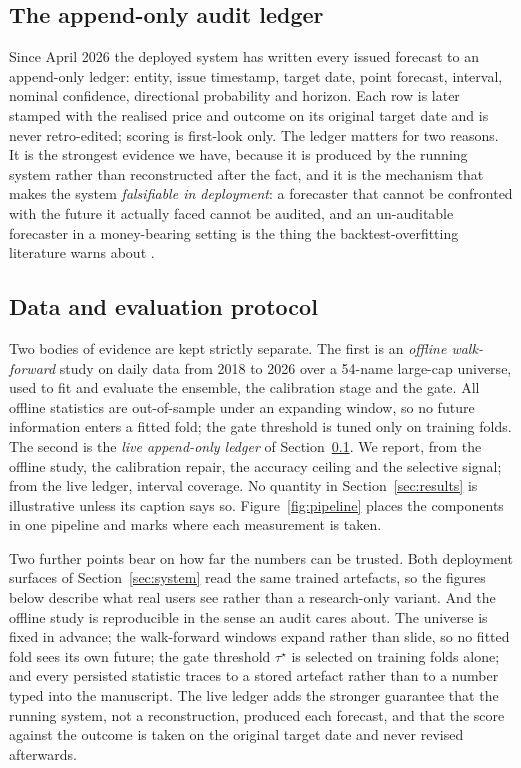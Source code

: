 \documentclass{sbc2023}%
\theoremstyle{definition}
\theoremstyle{plain}
\begin{document}
\subsection{The append-only audit ledger}
\label{sec:ledger}
Since April 2026 the deployed system has written every issued forecast to an
append-only ledger: entity, issue timestamp, target date, point forecast, interval,
nominal confidence, directional probability and horizon. Each row is later stamped
with the realised price and outcome on its original target date and is never
retro-edited; scoring is first-look only. The ledger matters for two reasons. It is
the strongest evidence we have, because it is produced by the running system rather
than reconstructed after the fact, and it is the mechanism that makes the system
\emph{falsifiable in deployment}: a forecaster that cannot be confronted with the
future it actually faced cannot be audited, and an un-auditable forecaster in a
money-bearing setting is the thing the backtest-overfitting literature warns about
\citep{bailey2017}.

\subsection{Data and evaluation protocol}
\label{sec:data}
Two bodies of evidence are kept strictly separate. The first is an \emph{offline
walk-forward} study on daily data from 2018 to 2026 over a 54-name large-cap universe,
used to fit and evaluate the ensemble, the calibration stage and the gate. All offline
statistics are out-of-sample under an expanding window, so no future information enters
a fitted fold; the gate threshold is tuned only on training folds. The second is the
\emph{live append-only ledger} of Section~\ref{sec:ledger}. We report, from the
offline study, the calibration repair, the accuracy ceiling and the selective signal;
from the live ledger, interval coverage. No quantity in Section~\ref{sec:results} is
illustrative unless its caption says so. Figure~\ref{fig:pipeline} places the
components in one pipeline and marks where each measurement is taken.

Two further points bear on how far the numbers can be trusted. Both deployment
surfaces of Section~\ref{sec:system} read the same trained artefacts, so the figures
below describe what real users see rather than a research-only variant. And the offline
study is reproducible in the sense an audit cares about. The universe is
fixed in advance; the walk-forward windows expand rather than slide, so no fitted fold
sees its own future; the gate threshold $\tau^\star$ is selected on training folds
alone; and every persisted statistic traces to a stored artefact rather than to a
number typed into the manuscript. The live ledger adds the stronger guarantee that the
running system, not a reconstruction, produced each forecast, and that the score
against the outcome is taken on the original target date and never revised afterwards.
\end{document}
